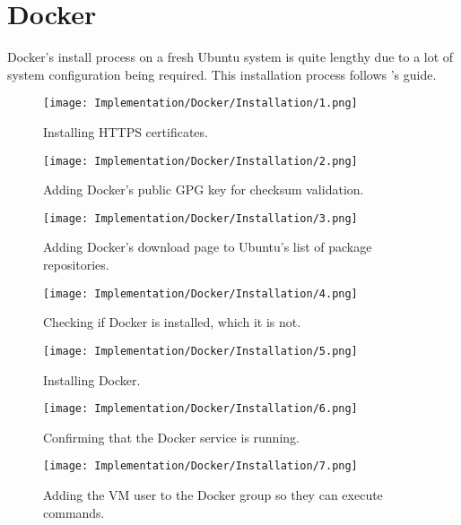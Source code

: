 \pagebreak 
\section{Docker}
Docker's install process on a fresh Ubuntu system is quite lengthy due to a lot of 
system configuration being required. This installation process follows 
\textcite{digitalocean_how_nodate}'s guide.

\begin{figure}[H]
    \centering
    \texttt{[image: Implementation/Docker/Installation/1.png]}
    \caption{Installing HTTPS certificates.}
    \label{fig:DockerInstall1}
\end{figure}

\begin{figure}[H]
    \centering
    \texttt{[image: Implementation/Docker/Installation/2.png]}
    \caption{Adding Docker's public GPG key for checksum validation.}
    \label{fig:DockerInstall2}
\end{figure}

\begin{figure}[H]
    \centering
    \texttt{[image: Implementation/Docker/Installation/3.png]}
    \caption{Adding Docker's download page to Ubuntu's list of package repositories.}
    \label{fig:DockerInstall3}
\end{figure}

\begin{figure}[H]
    \centering
    \texttt{[image: Implementation/Docker/Installation/4.png]}
    \caption{Checking if Docker is installed, which it is not.}
    \label{fig:DockerInstall4}
\end{figure}

\begin{figure}[H]
    \centering
    \texttt{[image: Implementation/Docker/Installation/5.png]}
    \caption{Installing Docker.}
    \label{fig:DockerInstall5}
\end{figure}

\begin{figure}[H]
    \centering
    \texttt{[image: Implementation/Docker/Installation/6.png]}
    \caption{Confirming that the Docker service is running.}
    \label{fig:DockerInstall6}
\end{figure}

\begin{figure}[H]
    \centering
    \texttt{[image: Implementation/Docker/Installation/7.png]}
    \caption{Adding the VM user to the Docker group so they can execute commands.}
    \label{fig:DockerInstall7}
\end{figure}

\endgroup